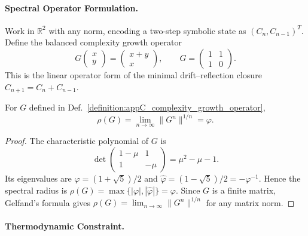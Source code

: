 \paragraph{Spectral Operator Formulation.}
\label{paragraph:appC_spectral_interpretation_and_banach_operator_radius}

\begin{definition}
\label{definition:appC_complexity_growth_operator}
Work in $\mathbb{R}^2$ with any norm, encoding a two-step symbolic state
as $(C_n,C_{n-1})^T$. Define the balanced complexity growth operator
\[
G\begin{pmatrix}x\\y\end{pmatrix}
=\begin{pmatrix}x+y\\x\end{pmatrix},
\qquad
G=\begin{pmatrix}1&1\\1&0\end{pmatrix}.
\]
This is the linear operator form of the minimal drift--reflection closure
$C_{n+1}=C_n+C_{n-1}$.
\end{definition}

\begin{theorem}
\label{theorem:appC_phi_as_spectral_radius}
For $G$ defined in Def.~\ref{definition:appC_complexity_growth_operator},
\[
\rho(G)=\lim_{n \to \infty} \|G^n\|^{1/n} = \varphi .
\]
\end{theorem}

\begin{proof}
\label{proof:appC_phi_as_spectral_radius}
The characteristic polynomial of $G$ is
\[
\det\!\begin{pmatrix}1-\mu&1\\1&-\mu\end{pmatrix}
=\mu^2-\mu-1.
\]
Its eigenvalues are $\varphi=(1+\sqrt5)/2$ and
$\widehat\varphi=(1-\sqrt5)/2=-\varphi^{-1}$. Hence the spectral radius is
$\rho(G)=\max\{|\varphi|,|\widehat\varphi|\}=\varphi$. Since $G$ is a finite
matrix, Gelfand's formula gives $\rho(G)=\lim_{n\to\infty}\|G^n\|^{1/n}$ for any
matrix norm.
\end{proof}

\paragraph{Thermodynamic Constraint.}
\label{paragraph:appC_entropic_efficiency_and_thermodynamic_link}

